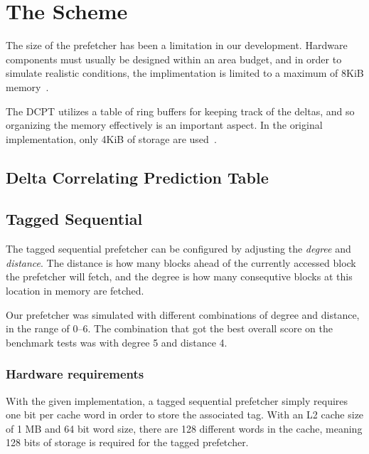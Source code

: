 \section{The Scheme}

The size of the prefetcher has been a limitation in our development. Hardware
components must usually be designed within an area budget, and in order to
simulate realistic conditions, the implimentation is limited to a maximum of
8KiB memory~\cite{guidelines}.


The DCPT utilizes a table of ring buffers for keeping track of the deltas, and
so organizing the memory effectively is an important aspect. In the original
implementation, only 4KiB of storage are used~\cite{dcpt}.


\subsection{Delta Correlating Prediction Table}

\subsection{Tagged Sequential}

The tagged sequential prefetcher can be configured by adjusting the
\emph{degree} and \emph{distance}. The distance is how many blocks ahead of the
currently accessed block the prefetcher will fetch, and the degree is how many
consequtive blocks at this location in memory are fetched.

Our prefetcher was simulated with different combinations of degree and distance,
in the range of 0--6. The combination that got the best overall score on the
benchmark tests was with degree 5 and distance 4.

\subsubsection{Hardware requirements}

With the given implementation, a tagged sequential prefetcher simply requires
one bit per cache word in order to store the associated tag. With an L2 cache
size of 1 MB and 64 bit word size, there are 128 different words in the cache,
meaning 128 bits of storage is required for the tagged prefetcher.


